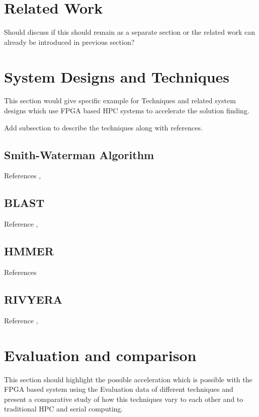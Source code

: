 \documentclass[12pt,twoside]{article}
\begin{document}
\section{Related Work}
\label{sec:relwork}

Should discuss if this should remain as a separate section or the related work can already be introduced in previous section?

\section{System Designs and Techniques}
\label{sec:designtech}

This section would give specific example for Techniques and related system designs which
use FPGA based HPC systems to accelerate the solution finding.

Add subsection to describe the techniques along with references.

\subsection{Smith-Waterman Algorithm}

References \cite{rucci_smith-waterman_2014}, \cite{smith_identification_1981}

\subsection{BLAST}
\label{sec:blast}

Reference \cite{mahram_fast_2010}, \cite{altschul_basic_1990}

\subsection{HMMER}

References \cite{oliver_integrating_2008} \cite{abbas_combining_2015}

\subsection{RIVYERA}

Reference \cite{wienbrandt_improvement_2012}, \cite{wienbrandt_fpga-based_2014}
\section{Evaluation and comparison}
\label{sec:eval}

This section should highlight the possible acceleration which is possible with the FPGA based system
using the Evaluation data of different techniques and present a comparative study of how this techniques
vary to each other and to traditional HPC and serial computing.
\end{document}
